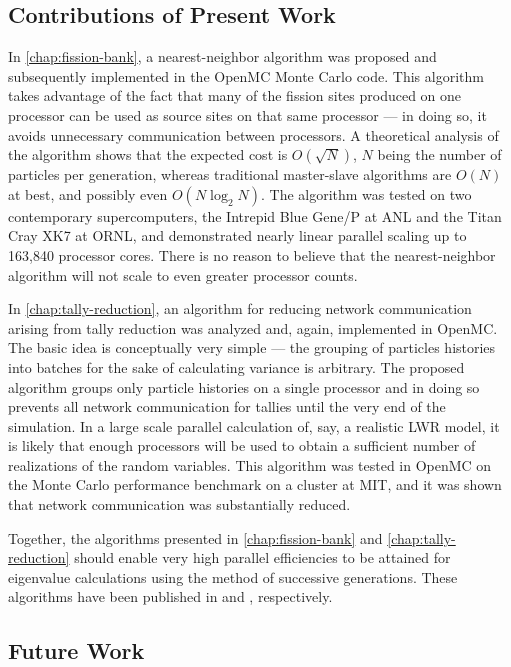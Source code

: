 \subsection{Contributions of Present Work}

In \autoref{chap:fission-bank}, a nearest-neighbor algorithm was proposed and
subsequently implemented in the OpenMC Monte Carlo code. This algorithm takes
advantage of the fact that many of the fission sites produced on one processor
can be used as source sites on that same processor --- in doing so, it avoids
unnecessary communication between processors. A theoretical analysis of the
algorithm shows that the expected cost is $O(\sqrt{N})$, $N$ being the number of
particles per generation, whereas traditional master-slave algorithms are $O(N)$
at best, and possibly even $O(N \log_2 N)$. The algorithm was tested on two
contemporary supercomputers, the Intrepid Blue Gene/P at ANL and the Titan Cray
XK7 at ORNL, and demonstrated nearly linear parallel scaling up to 163,840
processor cores. There is no reason to believe that the nearest-neighbor
algorithm will not scale to even greater processor counts.

In \autoref{chap:tally-reduction}, an algorithm for reducing network
communication arising from tally reduction was analyzed and, again, implemented
in OpenMC. The basic idea is conceptually very simple --- the grouping of
particles histories into batches for the sake of calculating variance is
arbitrary. The proposed algorithm groups only particle histories on a single
processor and in doing so prevents all network communication for tallies until
the very end of the simulation. In a large scale parallel calculation of, say, a
realistic LWR model, it is likely that enough processors will be used to obtain
a sufficient number of realizations of the random variables. This algorithm was
tested in OpenMC on the Monte Carlo performance benchmark on a cluster at MIT,
and it was shown that network communication was substantially reduced.

Together, the algorithms presented in \autoref{chap:fission-bank} and
\autoref{chap:tally-reduction} should enable very high parallel efficiencies to
be attained for eigenvalue calculations using the method of successive
generations. These algorithms have been published in \cite{nse-romano-2012} and
\cite{trans-romano-2012}, respectively.

\subsection{Future Work}

